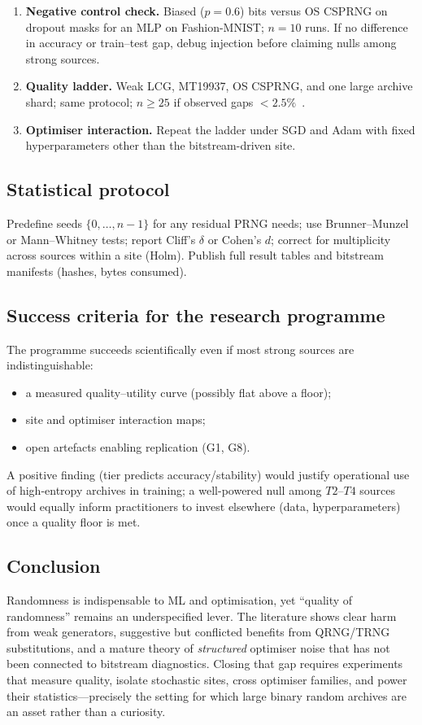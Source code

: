 \begin{enumerate}[leftmargin=*]
  \item \textbf{Negative control check.} Biased ($p=0.6$) bits versus OS CSPRNG on dropout masks for an MLP on Fashion-MNIST; $n=10$ runs.
  If no difference in accuracy or train--test gap, debug injection before claiming nulls among strong sources.
  \item \textbf{Quality ladder.} Weak LCG, MT19937, OS CSPRNG, and one large archive shard; same protocol; $n\geq 25$ if observed gaps $<2.5\%$~\cite{akesson2024reporting}.
  \item \textbf{Optimiser interaction.} Repeat the ladder under SGD and Adam with fixed hyperparameters other than the bitstream-driven site.
\end{enumerate}

\subsection{Statistical protocol}

Predefine seeds $\{0,\ldots,n-1\}$ for any residual PRNG needs; use Brunner--Munzel or Mann--Whitney tests; report Cliff's $\delta$ or Cohen's $d$; correct for multiplicity across sources within a site (Holm).
Publish full result tables and bitstream manifests (hashes, bytes consumed).

\subsection{Success criteria for the research programme}

The programme succeeds scientifically even if most strong sources are indistinguishable:
\begin{itemize}[leftmargin=*]
  \item a measured quality--utility curve (possibly flat above a floor);
  \item site and optimiser interaction maps;
  \item open artefacts enabling replication (G1, G8).
\end{itemize}
A positive finding (tier predicts accuracy/stability) would justify operational use of high-entropy archives in training; a well-powered null among $T2$--$T4$ sources would equally inform practitioners to invest elsewhere (data, hyperparameters) once a quality floor is met.

\subsection{Conclusion}

Randomness is indispensable to ML and optimisation, yet ``quality of randomness'' remains an underspecified lever.
The literature shows clear harm from weak generators, suggestive but conflicted benefits from QRNG/TRNG substitutions, and a mature theory of \emph{structured} optimiser noise that has not been connected to bitstream diagnostics.
Closing that gap requires experiments that measure quality, isolate stochastic sites, cross optimiser families, and power their statistics---precisely the setting for which large binary random archives are an asset rather than a curiosity.
